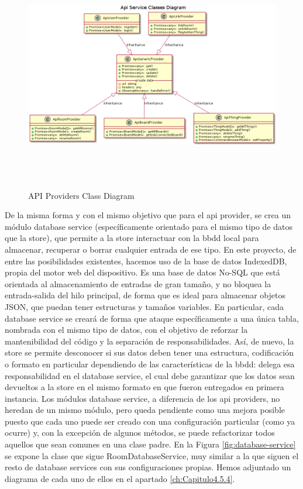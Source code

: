 \begin{figure}[hbt!]
\centering
\includegraphics[height=4in]{figures/diagrams/front/architecture/api-services.png}
\caption[api-services]{API Providers Class Diagram\footnotemark}
\label{fig:api-services}
\end{figure}

\vspace{1cm}

De la misma forma y con el mismo objetivo que para el api provider, se crea un módulo database service (específicamente orientado para el mismo tipo de datos que la store), que permite a la store interactuar con la \gls{bbdd} local para almacenar, recuperar o borrar cualquier entrada de ese tipo. En este proyecto, de entre las posibilidades existentes, hacemos uso de la base de datos IndexedDB, propia del motor web del dispositivo. Es una base de datos No-SQL que está orientada al almacenamiento de entradas de gran tamaño, y no bloquea la entrada-salida del hilo principal, de forma que es ideal para almacenar objetos JSON, que puedan tener estructuras y tamaños variables. En particular, cada database service se creará de forma que ataque específicamente a una única tabla, nombrada con el mismo tipo de datos, con el objetivo de reforzar la mantenibilidad del código y la separación de responsabilidades. Así, de nuevo, la store se permite desconocer si sus datos deben tener una estructura, codificación o formato en particular dependiendo de las características de la \gls{bbdd}: delega esa responsabilidad en el database service, el cual debe garantizar que los datos sean devueltos a la store en el mismo formato en que fueron entregados en primera instancia. 
Los módulos database service, a diferencia de los api providers, no heredan de un mismo módulo, pero queda pendiente como una mejora posible puesto que cada uno puede ser creado con una configuración particular (como ya ocurre) y, con la excepción de algunos métodos, se puede refactorizar todos aquellos que sean comunes en una clase padre. En la Figura \ref{fig:database-service} se expone la clase que sigue RoomDatabaseService, muy similar a la que siguen el resto de database services con sus configuraciones propias. Hemos adjuntado un diagrama de cada uno de ellos en el apartado \ref{ch:Capitulo4.5.4}.


